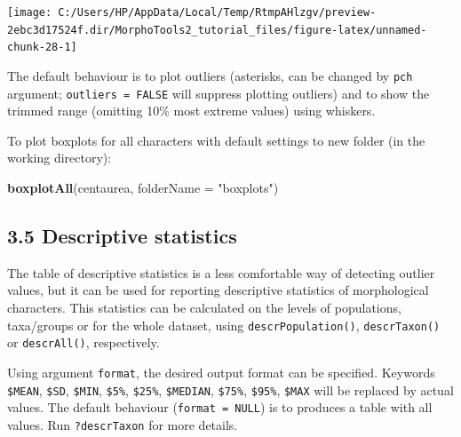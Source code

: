 \documentclass[
]{article}
\newenvironment{Shaded}{\begin{snugshade}}{\end{snugshade}}
\newcommand{\DataTypeTok}[1]{\textcolor[rgb]{0.13,0.29,0.53}{#1}}
\newcommand{\KeywordTok}[1]{\textcolor[rgb]{0.13,0.29,0.53}{\textbf{#1}}}
\newcommand{\NormalTok}[1]{#1}
\newcommand{\StringTok}[1]{\textcolor[rgb]{0.31,0.60,0.02}{#1}}
\begin{document}
\begin{center}\texttt{[image: C:/Users/HP/AppData/Local/Temp/RtmpAHlzgv/preview-2ebc3d17524f.dir/MorphoTools2\_tutorial\_files/figure-latex/unnamed-chunk-28-1]} \end{center}

The default behaviour is to plot outliers (asterisks, can be changed by
\texttt{pch} argument; \texttt{outliers\ =\ FALSE} will suppress
plotting outliers) and to show the trimmed range (omitting 10\% most
extreme values) using whiskers.

To plot boxplots for all characters with default settings to new folder
(in the working directory):

\begin{Shaded}
\begin{Highlighting}[]
\KeywordTok{boxplotAll}\NormalTok{(centaurea, }\DataTypeTok{folderName =} \StringTok{"boxplots"}\NormalTok{)}
\end{Highlighting}
\end{Shaded}

\hypertarget{descriptive-statistics}{%
\subsection{3.5 Descriptive statistics}\label{descriptive-statistics}}

The table of descriptive statistics is a less comfortable way of
detecting outlier values, but it can be used for reporting descriptive
statistics of morphological characters. This statistics can be
calculated on the levels of populations, taxa/groups or for the whole
dataset, using \texttt{descrPopulation()}, \texttt{descrTaxon()} or
\texttt{descrAll()}, respectively.

Using argument \texttt{format}, the desired output format can be
specified. Keywords \texttt{\$MEAN}, \texttt{\$SD}, \texttt{\$MIN},
\texttt{\$5\%}, \texttt{\$25\%}, \texttt{\$MEDIAN}, \texttt{\$75\%},
\texttt{\$95\%}, \texttt{\$MAX} will be replaced by actual values. The
default behaviour (\texttt{format\ =\ NULL}) is to produces a table with
all values. Run \texttt{?descrTaxon} for more details.
\end{document}
